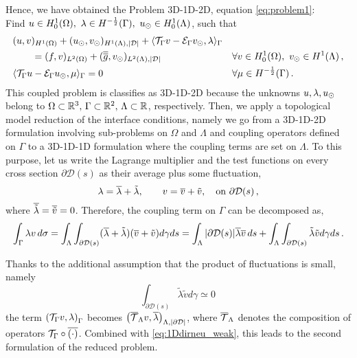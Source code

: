 Hence, we have obtained the Problem 3D-1D-2D, equation 
\eqref{eq:problem1}: \\
Find $u \in H^1_0(\Omega), \ \lambda \in H^{-\frac 1 2}(\Gamma ),\ u_{\odot} \in H^1_0(\Lambda)$, such that
\begin{subequations}
\begin{align*}
&(u,v)_{H^1(\Omega)} + (u_{\odot},v_{\odot})_{H^1(\Lambda),|\mathcal{D}|} 
+ \langle {\mathcal{T}_\Gamma} v  - \mathcal{E}_\Gamma v_{\odot}, \lambda \rangle_\Gamma &&
\\
\nonumber
&\qquad= (f,v)_{L^2(\Omega)} +  (\overline{\overline{g}},v_{\odot})_{L^2(\Lambda),|\mathcal{D}|}
\quad &&\forall v \in H^1_0(\Omega), \ v_{\odot} \in H^1(\Lambda)\,,
\\
& \langle {\mathcal{T}_\Gamma} u - \mathcal{E}_\Gamma u_{\odot} , \mu \rangle_\Gamma = 0
\quad && \forall \mu \in H^{-\frac 1 2}(\Gamma)\,.
\end{align*}
\end{subequations}
This coupled problem is classifies as 3D-1D-2D because the unknowns $u,\lambda,u_{\odot}$ belong to 
$\Omega \subset \mathbb{R}^3,\, \Gamma \subset \mathbb{R}^2,\, \Lambda \subset \mathbb{R}$, respectively.
Then, we apply a topological model reduction of the interface conditions, namely we go from a 3D-1D-2D formulation
involving sub-problems on $\Omega$ and $\Lambda$ and coupling operators defined on $\Gamma$
to a 3D-1D-1D formulation where the coupling terms are set on $\Lambda$. 
To this purpose, let us write the Lagrange multiplier and the test functions on every cross section $\partial\mathcal{D}(s)$ as their average plus some fluctuation,
\begin{equation*}
\lambda=\overline{\lambda}+\tilde{\lambda}, \qquad v=\overline{v}+\tilde{v},
\quad \text{on} \ \partial\mathcal{D}(s)\,,
\end{equation*}
where $\overline{\tilde{\lambda}}=\overline{\tilde{v}}=0$. 
Therefore, the coupling term on $\Gamma$ can be decomposed as,
\begin{equation*}
\int_{\Gamma}\lambda v\, d\sigma
=\int _{\Lambda}  \int_{\partial\mathcal{D}(s)} (\overline{\lambda}+\tilde{\lambda})(\overline{v}+\tilde{v})d\gamma ds
= \int_{\Lambda}|\partial\mathcal{D}(s)| \overline{\lambda}\overline{v}\,ds+\int_{\Lambda}  \int_{\partial\mathcal{D}(s)} \tilde{\lambda}\tilde{v}d\gamma ds\,.
\end{equation*}

Thanks to the additional assumption that the product of fluctuations is small, namely
\begin{equation*}
\int_{\partial\mathcal{D}(s)} \tilde{\lambda}\tilde{v} d\gamma \simeq 0\,
\end{equation*}
the term $\left({\mathcal{T}_\Gamma} v, \lambda \right)_{\Gamma}$ becomes $\left( {\overline{\mathcal{T}}_\Lambda} v, \overline{\lambda} \right)_{\Lambda, |\partial\mathcal{D}|}$, where ${\overline{\mathcal{T}}_\Lambda}$ denotes the composition of operators ${\mathcal{T}_\Gamma} \circ \overline{(\cdot)}$.  Combined with \eqref{eq:1Ddirneu_weak}, this leads to the second formulation of the reduced problem.

